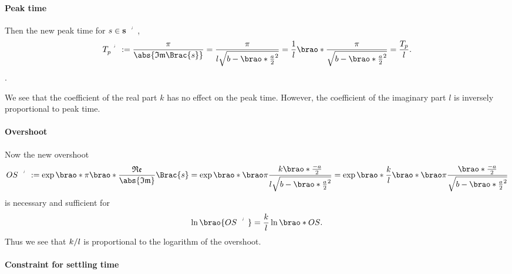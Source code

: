 \documentclass[11pt]{article}
\begin{document}
\begin{adjustwidth}{0.5in}{0in}
        \paragraph{Peak time}


        Then the new peak time for \(s \in \setprime{\mathbf{s}}\),
        \[
            \setprime{T}_p
            := \frac\pi{\abs{\mathfrak{Im}\Brac{s}}}
            = \frac\pi{l\sqrt{b - \brao*{\frac{a}2}^2}}
            = \frac{1}l \brao*{\frac\pi{\sqrt{b - \brao*{\frac{a}2}^2}}}
            = \frac{T_p}l.
        \].

        We see that the coefficient of the real part \(k\) has no effect on the peak time. However, the coefficient of the imaginary part \(l\) is inversely proportional to peak time.

        \paragraph{Overshoot}
        Now the new overshoot
        \[
                \setprime{OS}
                := \exp\brao*{\pi\brao*{\frac{\mathfrak{Re}}{\abs{\mathfrak{Im}}}}\Brac{s}}
                = \exp\brao*{\brao\pi\frac
                    {k\brao*{\frac{-a}2}}
                    {l\sqrt{b - \brao*{\frac{a}2}^2}}
                }
                = \exp\brao*{\frac{k}l\brao*{\brao\pi\frac
                    {\brao*{\frac{-a}2}}
                    {\sqrt{b - \brao*{\frac{a}2}^2}}
                }}
        \]
        is necessary and sufficient for
        \[
            \ln\brao{\setprime{OS}} = \frac{k}l\ln\brao*{OS}.
        \]
        Thus we see that \(k/l\) is proportional to the logarithm of the overshoot.

        \paragraph{Constraint for settling time}



\end{adjustwidth}
\end{document}
